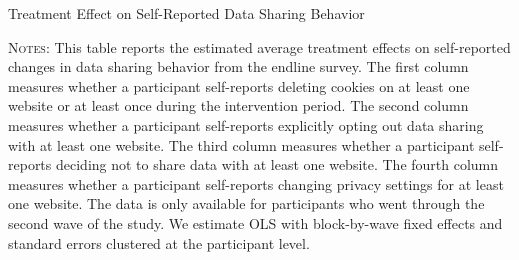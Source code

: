 \documentclass[12pt]{article}
\theoremstyle{definition}
\theoremstyle{remark}
\begin{document}
\begin{appendix}
\begin{table}[H] 
\caption{Treatment Effect on Self-Reported Data Sharing Behavior}\label{tab:treatment_effect_data_sharing}
\scalebox{0.9}{

}
\caption*{\scriptsize \textsc{Notes}: This table reports the estimated average treatment effects on self-reported changes in data sharing behavior from the endline survey. The first column measures whether a participant self-reports deleting cookies on at least one website or at least once during the intervention period. The second column measures whether a participant self-reports explicitly opting out data sharing with at least one website. The third column measures whether a participant self-reports deciding not to share data with at least one website. The fourth column measures whether a participant self-reports changing privacy settings for at least one website. The data is only available for participants who went through the second wave of the study. We estimate OLS with block-by-wave fixed effects and standard errors clustered at the participant level.}
\end{table}



\end{appendix}
\end{document}
